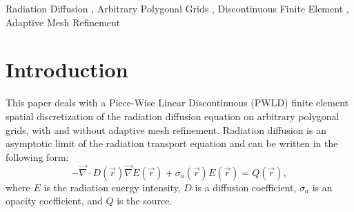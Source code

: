 \documentclass[preprint,10pt]{elsarticle}
\renewcommand{\div}{\vec{\nabla}\! \cdot \!}
\newcommand{\grad}{\vec{\nabla}}
\newcommand{\vr}{\vec{r}}
\newcommand{\tcr}[1]{\textcolor{red}{#1}}
\begin{document}
\begin{frontmatter}
\begin{abstract}
\end{abstract}

\begin{keyword}
  Radiation Diffusion \sep
	Arbitrary Polygonal Grids \sep
  Discontinuous Finite Element \sep
  Adaptive Mesh Refinement
\end{keyword}

\end{frontmatter}


\linenumbers

\section{Introduction} \label{sec:intro}


This paper deals with a Piece-Wise Linear Discontinuous (PWLD) finite element spatial discretization of 
the radiation diffusion equation on arbitrary polygonal grids, with and without adaptive mesh refinement. 
Radiation diffusion is an asymptotic limit of the radiation transport equation and can be 
written in the following form:
\begin{equation} \label{eq:radiation_diffusion}
- \div  D(\vr) \grad E(\vr) + \sigma_a(\vr) E(\vr) = Q(\vr) ,
\end{equation}
where $E$ is the radiation energy intensity, $D$ is a diffusion coefficient, $\sigma_a$ is 
an opacity coefficient, and $Q$ is the source.
\end{document}
